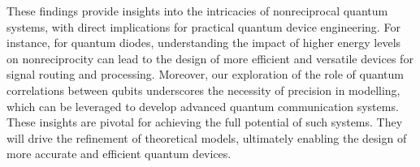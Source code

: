 \documentclass[lettersize,journal]{IEEEtran}
\begin{document}
These findings provide insights into the intricacies of nonreciprocal quantum systems, with direct implications for practical quantum device engineering. 
For instance, for quantum diodes, understanding the impact of higher energy levels on nonreciprocity can lead to the design of more efficient and versatile devices for signal routing and processing. 
Moreover, our exploration of the role of quantum correlations between qubits underscores the necessity of precision in modelling, which can be leveraged to develop advanced quantum communication systems. 
These insights are pivotal for achieving the full potential of such systems. They will drive the refinement of theoretical models, ultimately enabling the design of more accurate and efficient quantum devices. 





\end{document}
